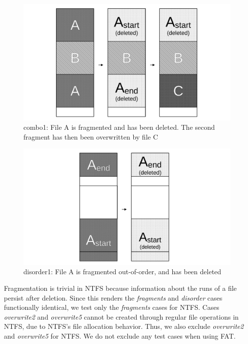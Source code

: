 \begin{figure}[h]
    \centering
    \includegraphics[width=\linewidth]{fig/case12.pdf}
    \caption{combo1: File A is fragmented and has been deleted. The second fragment has then been overwritten by file C}
    \label{fig:case12}
\end{figure}

\begin{figure}[h]
        \centering
        \includegraphics[width=\linewidth]{fig/case14.pdf}
        \caption{disorder1: File A is fragmented out-of-order, and has been deleted}
        \label{fig:case14}
\end{figure}


Fragmentation is trivial in NTFS because information about the runs of a file persist after deletion.
Since this renders the \emph{fragments} and \emph{disorder} cases functionally identical, we test only the \emph{fragments} cases for NTFS.
Cases \emph{overwrite2} and \emph{overwrite5} cannot be created through regular file operations in NTFS, due to NTFS's file allocation behavior.
Thus, we also exclude \emph{overwrite2} and \emph{overwrite5} for NTFS.
We do not exclude any test cases when using FAT.


